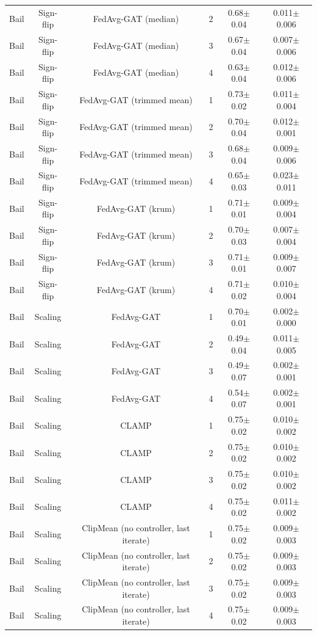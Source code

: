 \begin{table}[tbp]
\begin{tabular}{lccccc}
Bail & Sign-flip & FedAvg-GAT (median) & 2 & 0.68$\pm$0.04 & 0.011$\pm$0.006 \\
Bail & Sign-flip & FedAvg-GAT (median) & 3 & 0.67$\pm$0.04 & 0.007$\pm$0.006 \\
Bail & Sign-flip & FedAvg-GAT (median) & 4 & 0.63$\pm$0.04 & 0.012$\pm$0.006 \\
Bail & Sign-flip & FedAvg-GAT (trimmed mean) & 1 & 0.73$\pm$0.02 & 0.011$\pm$0.004 \\
Bail & Sign-flip & FedAvg-GAT (trimmed mean) & 2 & 0.70$\pm$0.04 & 0.012$\pm$0.001 \\
Bail & Sign-flip & FedAvg-GAT (trimmed mean) & 3 & 0.68$\pm$0.04 & 0.009$\pm$0.006 \\
Bail & Sign-flip & FedAvg-GAT (trimmed mean) & 4 & 0.65$\pm$0.03 & 0.023$\pm$0.011 \\
Bail & Sign-flip & FedAvg-GAT (krum) & 1 & 0.71$\pm$0.01 & 0.009$\pm$0.004 \\
Bail & Sign-flip & FedAvg-GAT (krum) & 2 & 0.70$\pm$0.03 & 0.007$\pm$0.004 \\
Bail & Sign-flip & FedAvg-GAT (krum) & 3 & 0.71$\pm$0.01 & 0.009$\pm$0.007 \\
Bail & Sign-flip & FedAvg-GAT (krum) & 4 & 0.71$\pm$0.02 & 0.010$\pm$0.004 \\
Bail & Scaling & FedAvg-GAT & 1 & 0.70$\pm$0.01 & 0.002$\pm$0.000 \\
Bail & Scaling & FedAvg-GAT & 2 & 0.49$\pm$0.04 & 0.011$\pm$0.005 \\
Bail & Scaling & FedAvg-GAT & 3 & 0.49$\pm$0.07 & 0.002$\pm$0.001 \\
Bail & Scaling & FedAvg-GAT & 4 & 0.54$\pm$0.07 & 0.002$\pm$0.001 \\
Bail & Scaling & CLAMP & 1 & 0.75$\pm$0.02 & 0.010$\pm$0.002 \\
Bail & Scaling & CLAMP & 2 & 0.75$\pm$0.02 & 0.010$\pm$0.002 \\
Bail & Scaling & CLAMP & 3 & 0.75$\pm$0.02 & 0.010$\pm$0.002 \\
Bail & Scaling & CLAMP & 4 & 0.75$\pm$0.02 & 0.011$\pm$0.002 \\
Bail & Scaling & ClipMean (no controller, last iterate) & 1 & 0.75$\pm$0.02 & 0.009$\pm$0.003 \\
Bail & Scaling & ClipMean (no controller, last iterate) & 2 & 0.75$\pm$0.02 & 0.009$\pm$0.003 \\
Bail & Scaling & ClipMean (no controller, last iterate) & 3 & 0.75$\pm$0.02 & 0.009$\pm$0.003 \\
Bail & Scaling & ClipMean (no controller, last iterate) & 4 & 0.75$\pm$0.02 & 0.009$\pm$0.003 \\

\end{tabular}
\end{table}
